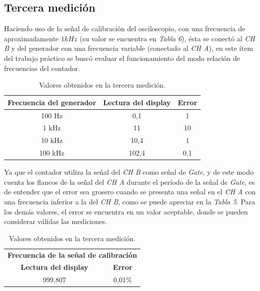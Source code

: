 \documentclass{article}
\begin{document}
\subsection{Tercera medición}
\medskip

	Haciendo uso de la señal de calibración del osciloscopio, con una frecuencia de aproximadamente $1 kHz$ (su valor se encuentra en \textit{Tabla 6}), ésta se conectó al \textit{CH B} y del generador con una frecuencia variable (conectado al \textit{CH A}), en este ítem del trabajo práctico se buscó evaluar el funcionamiento del modo relación de frecuencias del contador.
\bigskip


\begin{table}[!hbt]
	\begin{center}
		\begin{tabular}{|c|c|c|} \hline
			\textbf{Frecuencia del generador} & \textbf{Lectura del display} & \textbf{Error} \\\hline
			100 Hz & 0,1 & 1 \\\hline
			1 kHz & 11 & 10 \\\hline
			10 kHz & 10,4 & 1 \\\hline
			100 kHz & 102,4 & 0,1 \\\hline
		\end{tabular}

	\caption{Valores obtenidos en la tercera medición.}
	\end{center}
\end{table}
\medskip


	Ya que el contador utiliza la señal del \textit{CH B} como señal de \textit{Gate}, y de este modo cuenta los flancos de la señal del \textit{CH A} durante el período  de la señal de \textit{Gate}, es de entender que el error sea grosero cuando se presenta una señal en el \textit{CH A} con una frecuencia inferior a la del \textit{CH B}, como se puede apreciar en la \textit{Tabla 5}. Para los demás valores, el error se encuentra en un valor aceptable, donde se pueden considerar válidas las mediciones.
\bigskip


\begin{table}[!hbt]
	\begin{center}
		\begin{tabular}{|c|c|} \hline
			\multicolumn{2}{|c|}{\textbf{Frecuencia de la señal de calibración}} \\\cline{1-2}
			\textbf{Lectura del display} & \textbf{Error} \\\hline
			999,807 & 0,01\%\\\hline
		\end{tabular}

	\caption{Valores obtenidos en la tercera medición.}
	\end{center}
\end{table}
\medskip
\end{document}
